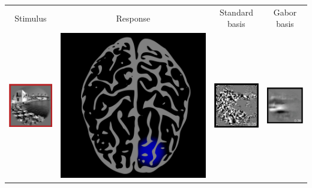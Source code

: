 \documentclass{beamer}
\begin{document}
\begin{frame}
\begin{center}
\begin{tabular}{c||c||c|c}
Stimulus & Response & Standard basis & Gabor basis\\
\includegraphics[scale = 0.22]{i11.png} 
& \includegraphics[scale = 0.035]{brain7.png} 
& \includegraphics[scale = .22]{i12.png}
& \includegraphics[scale = .22]{i13.png}\\ \hline

\end{tabular}
\end{center}
\end{frame}
\end{document}
